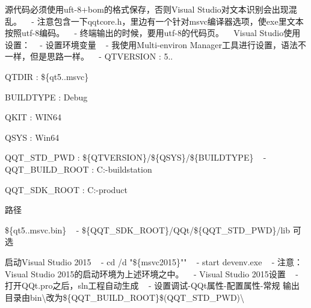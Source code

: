 \begin{DoxyItemize}
\item 源代码必须使用uft-\/8+bom的格式保存，否则\+Visual Studio对文本识别会出现混乱。 ~\newline
-\/ 注意包含一下qqtcore.\+h，里边有一个针对msvc编译器选项，使exe里文本按照utf-\/8编码。 ~\newline
-\/ 终端输出的时候，要用utf-\/8的代码页。 ~\newline
 Visual Studio使用设置： ~\newline
-\/ 设置环境变量 ~\newline
 -\/ 我使用\+Multi-\/environ Manager工具进行设置，语法不一样，但是思路一样。 ~\newline
 -\/ Q\+T\+V\+E\+R\+S\+I\+ON \+: 5..
\begin{DoxyItemize}
\item Q\+T\+D\+IR \+: \$\{qt5..\+msvc\}
\item B\+U\+I\+L\+D\+T\+Y\+PE \+: Debug
\item Q\+K\+IT \+: W\+I\+N64
\item Q\+S\+YS \+: Win64
\item Q\+Q\+T\+\_\+\+S\+T\+D\+\_\+\+P\+WD \+: \$\{Q\+T\+V\+E\+R\+S\+I\+ON\}/\$\{Q\+S\+YS\}/\$\{B\+U\+I\+L\+D\+T\+Y\+PE\} ~\newline
 -\/ Q\+Q\+T\+\_\+\+B\+U\+I\+L\+D\+\_\+\+R\+O\+OT \+: C\+:-\/buildstation
\item Q\+Q\+T\+\_\+\+S\+D\+K\+\_\+\+R\+O\+OT \+: C\+:-\/product
\item 路径
\begin{DoxyItemize}
\item \$\{qt5..\+msvc.\+bin\} ~\newline
 -\/ \$\{Q\+Q\+T\+\_\+\+S\+D\+K\+\_\+\+R\+O\+OT\}/\+Q\+Qt/\$\{Q\+Q\+T\+\_\+\+S\+T\+D\+\_\+\+P\+WD\}/lib 可选
\end{DoxyItemize}
\end{DoxyItemize}
\item 启动\+Visual Studio 2015 ~\newline
 -\/ cd /d "\$\{msvc2015\}"" ~\newline
 -\/ start devenv.\+exe ~\newline
 -\/ 注意：\+Visual Studio 2015的启动环境为上述环境之中。 ~\newline
-\/ Visual Studio 2015设置 ~\newline
 -\/ 打开\+Q\+Qt.\+pro之后，sln工程自动生成 ~\newline
 -\/ 设置调试-\/\+Q\+Qt属性-\/配置属性-\/常规 输出目录由bin\textbackslash{}改为\$\{Q\+Q\+T\+\_\+\+B\+U\+I\+L\+D\+\_\+\+R\+O\+OT\}\$(Q\+Q\+T\+\_\+\+S\+T\+D\+\_\+\+P\+WD)\textbackslash{}

\end{DoxyItemize}
